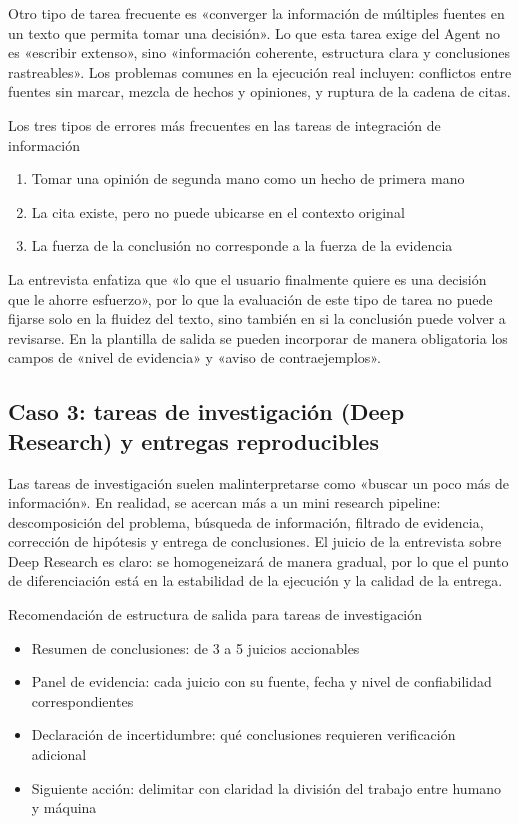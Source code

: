 Otro tipo de tarea frecuente es «converger la información de múltiples fuentes en un texto que permita tomar una decisión». Lo que esta tarea exige del Agent no es «escribir extenso», sino «información coherente, estructura clara y conclusiones rastreables». Los problemas comunes en la ejecución real incluyen: conflictos entre fuentes sin marcar, mezcla de hechos y opiniones, y ruptura de la cadena de citas.

\begin{warningbox}{Los tres tipos de errores más frecuentes en las tareas de integración de información}
\begin{enumerate}
    \item Tomar una opinión de segunda mano como un hecho de primera mano
    \item La cita existe, pero no puede ubicarse en el contexto original
    \item La fuerza de la conclusión no corresponde a la fuerza de la evidencia
\end{enumerate}
\end{warningbox}

La entrevista enfatiza que «lo que el usuario finalmente quiere es una decisión que le ahorre esfuerzo», por lo que la evaluación de este tipo de tarea no puede fijarse solo en la fluidez del texto, sino también en si la conclusión puede volver a revisarse. En la plantilla de salida se pueden incorporar de manera obligatoria los campos de «nivel de evidencia» y «aviso de contraejemplos».

\subsection{Caso 3: tareas de investigación (Deep Research) y entregas reproducibles}

Las tareas de investigación suelen malinterpretarse como «buscar un poco más de información». En realidad, se acercan más a un mini research pipeline: descomposición del problema, búsqueda de información, filtrado de evidencia, corrección de hipótesis y entrega de conclusiones. El juicio de la entrevista sobre Deep Research es claro: se homogeneizará de manera gradual, por lo que el punto de diferenciación está en la estabilidad de la ejecución y la calidad de la entrega.

\begin{knowledgebox}{Recomendación de estructura de salida para tareas de investigación}
\begin{itemize}
    \item Resumen de conclusiones: de 3 a 5 juicios accionables
    \item Panel de evidencia: cada juicio con su fuente, fecha y nivel de confiabilidad correspondientes
    \item Declaración de incertidumbre: qué conclusiones requieren verificación adicional
    \item Siguiente acción: delimitar con claridad la división del trabajo entre humano y máquina
\end{itemize}
\end{knowledgebox}

